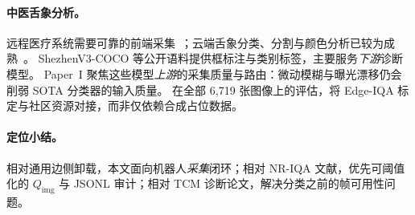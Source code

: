 \paragraph{中医舌象分析。}
远程医疗系统需要可靠的前端采集~\cite{chen2021telemed}；云端舌象分类、分割与颜色分析已较为成熟~\cite{zhang2020tongue,qi2016tongue,huang2015tcn}。
ShezhenV3-COCO 等公开语料提供框标注与类别标签，主要服务\emph{下游}诊断模型。
Paper~I 聚焦这些模型\emph{上游}的采集质量与路由：微动模糊与曝光漂移仍会削弱 SOTA 分类器的输入质量。
在全部 6{,}719 张图像上的评估，将 Edge-IQA 标定与社区资源对接，而非仅依赖合成占位数据。

\paragraph{定位小结。}
相对通用边侧卸载，本文面向机器人\emph{采集}闭环；相对 NR-IQA 文献，优先可阈值化的 $Q_{\mathrm{img}}$ 与 JSONL 审计；相对 TCM 诊断论文，解决分类之前的帧可用性问题。
